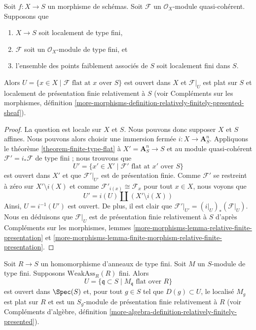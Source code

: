 \begin{lemma}
\label{lemma-finite-type-flat}
Soit $f : X \to S$ un morphisme de schémas.
Soit $\mathcal{F}$ un $\mathcal{O}_X$-module quasi-cohérent.
Supposons que
\begin{enumerate}
\item $X \to S$ soit localement de type fini,
\item $\mathcal{F}$ soit un $\mathcal{O}_X$-module de type fini, et
\item l'ensemble des points faiblement associés de $S$ soit localement fini dans $S$.
\end{enumerate}
Alors $U = \{x \in X \mid \mathcal{F}\text{ flat at }x\text{ over }S\}$
est ouvert dans $X$ et $\mathcal{F}|_U$ est plat sur $S$ et localement
de présentation finie relativement à $S$ (voir
Compléments sur les morphismes, définition
\ref{more-morphisms-definition-relatively-finitely-presented-sheaf}).
\end{lemma}

\begin{proof}
La question est locale sur $X$ et $S$. Nous pouvons donc supposer $X$ et $S$ affines.
Nous pouvons alors choisir une immersion fermée $i : X \to \mathbf{A}^n_S$.
Appliquons le théorème \ref{theorem-finite-type-flat} à $X' = \mathbf{A}^n_S \to S$
et au module quasi-cohérent $\mathcal{F}' = i_*\mathcal{F}$ de type fini ;
nous trouvons que
$$
U' = \{x' \in X' \mid \mathcal{F}'\text{ flat at }x'\text{ over }S\}
$$
est ouvert dans $X'$ et que $\mathcal{F}'|_{U'}$ est de présentation finie.
Comme $\mathcal{F}'$ se restreint à zéro sur $X' \setminus i(X)$ et
comme $\mathcal{F}'_{i(x)} \cong \mathcal{F}_x$ pour tout $x \in X$, nous voyons que
$$
U' = i(U) \amalg (X' \setminus i(X))
$$
Ainsi, $U = i^{-1}(U')$ est ouvert. De plus, il est clair que
$\mathcal{F}'|_{U'} = (i|_U)_*(\mathcal{F}|_U)$.
Nous en déduisons que $\mathcal{F}|_U$ est de présentation finie
relativement à $S$ d'après Compléments sur les morphismes, lemmes
\ref{more-morphisms-lemma-relative-finite-presentation} et
\ref{more-morphisms-lemma-finite-morphism-relative-finite-presentation}.
\end{proof}

\begin{lemma}
\label{lemma-finite-type-flat-algebra-bis}
Soit $R \to S$ un homomorphisme d'anneaux de type fini.
Soit $M$ un $S$-module de type fini.
Supposons $\text{WeakAss}_R(R)$ fini.
Alors
$$
U = \{\mathfrak q \subset S \mid M_{\mathfrak q}\text{ flat over }R\}
$$
est ouvert dans $\Spec(S)$ et, pour tout $g \in S$ tel que
$D(g) \subset U$, le localisé $M_g$ est plat sur $R$ et
est un $S_g$-module de présentation finie relativement à $R$ (voir
Compléments d'algèbre, définition
\ref{more-algebra-definition-relatively-finitely-presented}).
\end{lemma}

